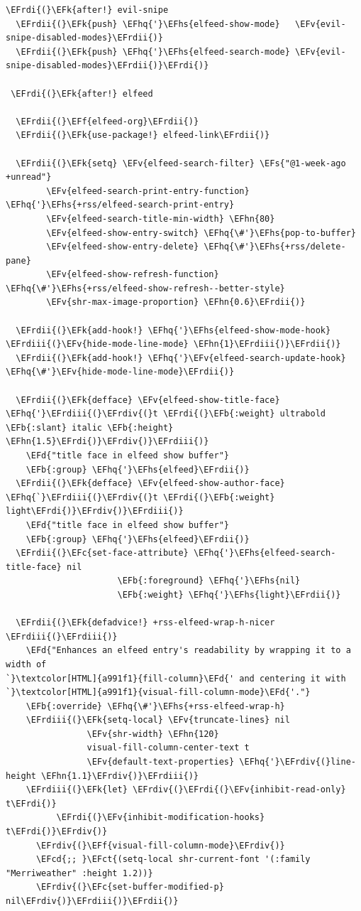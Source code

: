 \documentclass{scrartcl}
\newcommand{\EFk}[1]{\textcolor{EFk}{#1}} %
\newcommand{\EFd}[1]{\textcolor{EFd}{#1}} %
\newcommand{\EFs}[1]{\textcolor{EFs}{#1}} %
\newcommand{\EFb}[1]{\textcolor{EFb}{#1}} %
\newcommand{\EFct}[1]{\textcolor{EFct}{#1}} %
\newcommand{\EFc}[1]{\textcolor{EFc}{#1}} %
\newcommand{\EFv}[1]{\textcolor{EFv}{#1}} %
\newcommand{\EFf}[1]{\textcolor{EFf}{#1}} %
\newcommand{\EFcd}[1]{\textcolor{EFcd}{#1}} %
\newcommand{\EFhn}[1]{#1} %
\newcommand{\EFhq}[1]{#1} %
\newcommand{\EFhs}[1]{#1} %
\newcommand{\EFrdi}[1]{#1} %
\newcommand{\EFrdii}[1]{#1} %
\newcommand{\EFrdiii}[1]{#1} %
\newcommand{\EFrdiv}[1]{#1} %
\begin{document}
\begin{Code}
\begin{Verbatim}[]
\EFrdi{(}\EFk{after!} evil-snipe
  \EFrdii{(}\EFk{push} \EFhq{'}\EFhs{elfeed-show-mode}   \EFv{evil-snipe-disabled-modes}\EFrdii{)}
  \EFrdii{(}\EFk{push} \EFhq{'}\EFhs{elfeed-search-mode} \EFv{evil-snipe-disabled-modes}\EFrdii{)}\EFrdi{)}

 \EFrdi{(}\EFk{after!} elfeed

  \EFrdii{(}\EFf{elfeed-org}\EFrdii{)}
  \EFrdii{(}\EFk{use-package!} elfeed-link\EFrdii{)}

  \EFrdii{(}\EFk{setq} \EFv{elfeed-search-filter} \EFs{"@1-week-ago +unread"}
        \EFv{elfeed-search-print-entry-function} \EFhq{'}\EFhs{+rss/elfeed-search-print-entry}
        \EFv{elfeed-search-title-min-width} \EFhn{80}
        \EFv{elfeed-show-entry-switch} \EFhq{\#'}\EFhs{pop-to-buffer}
        \EFv{elfeed-show-entry-delete} \EFhq{\#'}\EFhs{+rss/delete-pane}
        \EFv{elfeed-show-refresh-function} \EFhq{\#'}\EFhs{+rss/elfeed-show-refresh--better-style}
        \EFv{shr-max-image-proportion} \EFhn{0.6}\EFrdii{)}

  \EFrdii{(}\EFk{add-hook!} \EFhq{'}\EFhs{elfeed-show-mode-hook} \EFrdiii{(}\EFv{hide-mode-line-mode} \EFhn{1}\EFrdiii{)}\EFrdii{)}
  \EFrdii{(}\EFk{add-hook!} \EFhq{'}\EFv{elfeed-search-update-hook} \EFhq{\#'}\EFv{hide-mode-line-mode}\EFrdii{)}

  \EFrdii{(}\EFk{defface} \EFv{elfeed-show-title-face} \EFhq{'}\EFrdiii{(}\EFrdiv{(}t \EFrdi{(}\EFb{:weight} ultrabold \EFb{:slant} italic \EFb{:height} \EFhn{1.5}\EFrdi{)}\EFrdiv{)}\EFrdiii{)}
    \EFd{"title face in elfeed show buffer"}
    \EFb{:group} \EFhq{'}\EFhs{elfeed}\EFrdii{)}
  \EFrdii{(}\EFk{defface} \EFv{elfeed-show-author-face} \EFhq{`}\EFrdiii{(}\EFrdiv{(}t \EFrdi{(}\EFb{:weight} light\EFrdi{)}\EFrdiv{)}\EFrdiii{)}
    \EFd{"title face in elfeed show buffer"}
    \EFb{:group} \EFhq{'}\EFhs{elfeed}\EFrdii{)}
  \EFrdii{(}\EFc{set-face-attribute} \EFhq{'}\EFhs{elfeed-search-title-face} nil
                      \EFb{:foreground} \EFhq{'}\EFhs{nil}
                      \EFb{:weight} \EFhq{'}\EFhs{light}\EFrdii{)}

  \EFrdii{(}\EFk{defadvice!} +rss-elfeed-wrap-h-nicer \EFrdiii{(}\EFrdiii{)}
    \EFd{"Enhances an elfeed entry's readability by wrapping it to a width of
`}\textcolor[HTML]{a991f1}{fill-column}\EFd{' and centering it with `}\textcolor[HTML]{a991f1}{visual-fill-column-mode}\EFd{'."}
    \EFb{:override} \EFhq{\#'}\EFhs{+rss-elfeed-wrap-h}
    \EFrdiii{(}\EFk{setq-local} \EFv{truncate-lines} nil
                \EFv{shr-width} \EFhn{120}
                visual-fill-column-center-text t
                \EFv{default-text-properties} \EFhq{'}\EFrdiv{(}line-height \EFhn{1.1}\EFrdiv{)}\EFrdiii{)}
    \EFrdiii{(}\EFk{let} \EFrdiv{(}\EFrdi{(}\EFv{inhibit-read-only} t\EFrdi{)}
          \EFrdi{(}\EFv{inhibit-modification-hooks} t\EFrdi{)}\EFrdiv{)}
      \EFrdiv{(}\EFf{visual-fill-column-mode}\EFrdiv{)}
      \EFcd{;; }\EFct{(setq-local shr-current-font '(:family "Merriweather" :height 1.2))}
      \EFrdiv{(}\EFc{set-buffer-modified-p} nil\EFrdiv{)}\EFrdiii{)}\EFrdii{)}


\end{Verbatim}
\end{Code}
\end{document}
